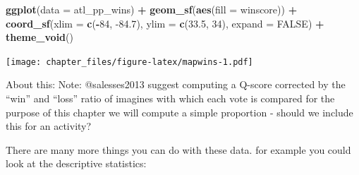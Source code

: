 \documentclass[
]{article}
\newenvironment{Shaded}{\begin{snugshade}}{\end{snugshade}}
\newcommand{\CommentTok}[1]{\textcolor[rgb]{0.56,0.35,0.01}{\textit{#1}}}
\newcommand{\DataTypeTok}[1]{\textcolor[rgb]{0.13,0.29,0.53}{#1}}
\newcommand{\DecValTok}[1]{\textcolor[rgb]{0.00,0.00,0.81}{#1}}
\newcommand{\FloatTok}[1]{\textcolor[rgb]{0.00,0.00,0.81}{#1}}
\newcommand{\KeywordTok}[1]{\textcolor[rgb]{0.13,0.29,0.53}{\textbf{#1}}}
\newcommand{\NormalTok}[1]{#1}
\newcommand{\OperatorTok}[1]{\textcolor[rgb]{0.81,0.36,0.00}{\textbf{#1}}}
\newcommand{\OtherTok}[1]{\textcolor[rgb]{0.56,0.35,0.01}{#1}}
\newcommand{\StringTok}[1]{\textcolor[rgb]{0.31,0.60,0.02}{#1}}
\begin{document}
\begin{Shaded}
\end{Shaded}

\begin{Shaded}
\begin{Highlighting}[]
\KeywordTok{ggplot}\NormalTok{(}\DataTypeTok{data =}\NormalTok{ atl_pp_wins) }\OperatorTok{+}\StringTok{ }
\StringTok{  }\KeywordTok{geom_sf}\NormalTok{(}\KeywordTok{aes}\NormalTok{(}\DataTypeTok{fill =}\NormalTok{ winscore)) }\OperatorTok{+}
\StringTok{  }\KeywordTok{coord_sf}\NormalTok{(}\DataTypeTok{xlim =} \KeywordTok{c}\NormalTok{(}\OperatorTok{-}\DecValTok{84}\NormalTok{, }\FloatTok{-84.7}\NormalTok{), }\DataTypeTok{ylim =} \KeywordTok{c}\NormalTok{(}\FloatTok{33.5}\NormalTok{, }\DecValTok{34}\NormalTok{), }\DataTypeTok{expand =} \OtherTok{FALSE}\NormalTok{) }\OperatorTok{+}
\StringTok{  }\KeywordTok{theme_void}\NormalTok{() }
\end{Highlighting}
\end{Shaded}

\texttt{[image: chapter\_files/figure-latex/mapwins-1.pdf]}

About this: Note: @salesses2013 suggest computing a Q-score corrected by
the ``win'' and ``loss'' ratio of imagines with which each vote is
compared for the purpose of this chapter we will compute a simple
proportion - should we include this for an activity?

There are many more things you can do with these data. for example you
could look at the descriptive statistics:

\begin{Shaded}
\end{Shaded}
\end{document}
